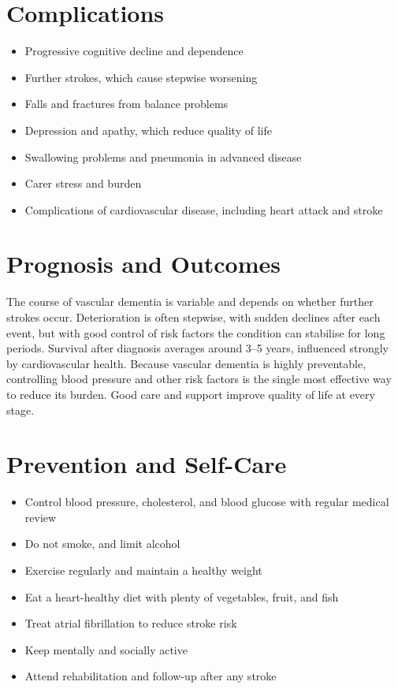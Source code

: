 \section*{Complications}
\begin{itemize}
    \item Progressive cognitive decline and dependence
    \item Further strokes, which cause stepwise worsening
    \item Falls and fractures from balance problems
    \item Depression and apathy, which reduce quality of life
    \item Swallowing problems and pneumonia in advanced disease
    \item Carer stress and burden
    \item Complications of cardiovascular disease, including heart attack and stroke
\end{itemize}

\section*{Prognosis and Outcomes}
The course of vascular dementia is variable and depends on whether further strokes occur. Deterioration is often stepwise, with sudden declines after each event, but with good control of risk factors the condition can stabilise for long periods. Survival after diagnosis averages around 3--5 years, influenced strongly by cardiovascular health. Because vascular dementia is highly preventable, controlling blood pressure and other risk factors is the single most effective way to reduce its burden. Good care and support improve quality of life at every stage.

\section*{Prevention and Self-Care}
\begin{itemize}
    \item Control blood pressure, cholesterol, and blood glucose with regular medical review
    \item Do not smoke, and limit alcohol
    \item Exercise regularly and maintain a healthy weight
    \item Eat a heart-healthy diet with plenty of vegetables, fruit, and fish
    \item Treat atrial fibrillation to reduce stroke risk
    \item Keep mentally and socially active
    \item Attend rehabilitation and follow-up after any stroke
\end{itemize}

